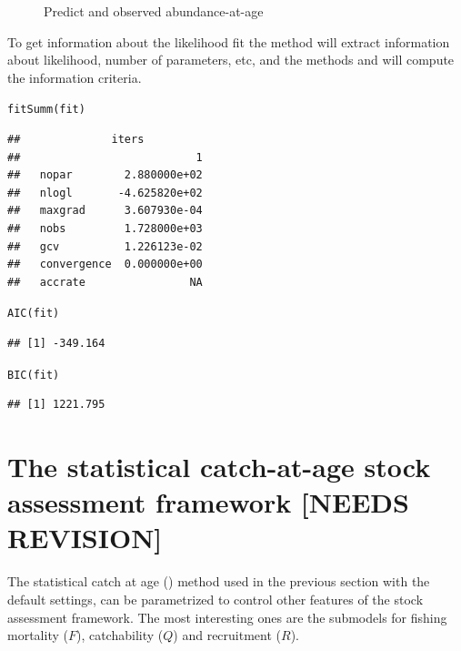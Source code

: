 \documentclass[a4paper,english,10pt]{article}\usepackage[]{graphicx}\usepackage[]{color}
\makeatletter
\newcommand{\hlstd}[1]{\textcolor[rgb]{0.196,0.196,0.196}{#1}}%
\newcommand{\hlkwd}[1]{\textcolor[rgb]{0.78,0.227,0.412}{#1}}%
\newenvironment{kframe}{%
 \def\at@end@of@kframe{}%
 \ifinner\ifhmode%
  \def\at@end@of@kframe{\end{minipage}}%
  \begin{minipage}{\columnwidth}%
 \fi\fi%
 \def\FrameCommand##1{\hskip\@totalleftmargin \hskip-\fboxsep
 \colorbox{shadecolor}{##1}\hskip-\fboxsep
     \hskip-\linewidth \hskip-\@totalleftmargin \hskip\columnwidth}%
 \MakeFramed {\advance\hsize-\width
   \@totalleftmargin\z@ \linewidth\hsize
   \@setminipage}}%
 {\par\unskip\endMakeFramed%
 \at@end@of@kframe}
\newenvironment{knitrout}{}{} %
\makeatother
\begin{document}
\begin{knitrout}
\begin{figure}[H]
{}

\caption[Predict and observed abundance-at-age]{Predict and observed abundance-at-age}\label{fig:idxplt6}
\end{figure}


\end{knitrout}



To get information about the likelihood fit the method  will extract information about likelihood, number of parameters, etc, and the methods  and  will compute the information criteria.

\begin{knitrout}
\color{fgcolor}\begin{kframe}
\begin{alltt}
\hlkwd{fitSumm}\hlstd{(fit)}
\end{alltt}
\begin{verbatim}
##              iters
##                           1
##   nopar        2.880000e+02
##   nlogl       -4.625820e+02
##   maxgrad      3.607930e-04
##   nobs         1.728000e+03
##   gcv          1.226123e-02
##   convergence  0.000000e+00
##   accrate                NA
\end{verbatim}
\begin{alltt}
\hlkwd{AIC}\hlstd{(fit)}
\end{alltt}
\begin{verbatim}
## [1] -349.164
\end{verbatim}
\begin{alltt}
\hlkwd{BIC}\hlstd{(fit)}
\end{alltt}
\begin{verbatim}
## [1] 1221.795
\end{verbatim}
\end{kframe}
\end{knitrout}

\section{The statistical catch-at-age stock assessment framework [NEEDS REVISION]}

The statistical catch at age () method used in the previous section with the default settings, can be parametrized to control other features of the stock assessment framework. The most interesting ones are the submodels for fishing mortality ($F$), catchability ($Q$) and recruitment ($R$).
\end{document}
